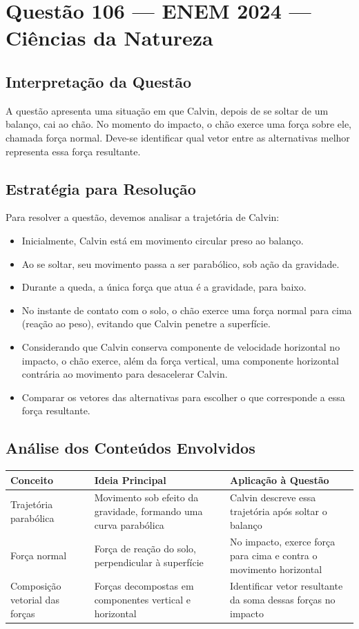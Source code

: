 \documentclass{article}
\begin{document}
\section*{Questão 106 — ENEM 2024 — Ciências da Natureza}

\subsection*{Interpretação da Questão}
A questão apresenta uma situação em que Calvin, depois de se soltar de um balanço, cai ao chão. No momento do impacto, o chão exerce uma força sobre ele, chamada força normal. Deve-se identificar qual vetor entre as alternativas melhor representa essa força resultante.

\subsection*{Estratégia para Resolução}
Para resolver a questão, devemos analisar a trajetória de Calvin:
\begin{itemize}
  \item Inicialmente, Calvin está em movimento circular preso ao balanço.
  \item Ao se soltar, seu movimento passa a ser parabólico, sob ação da gravidade.
  \item Durante a queda, a única força que atua é a gravidade, para baixo.
  \item No instante de contato com o solo, o chão exerce uma força normal para cima (reação ao peso), evitando que Calvin penetre a superfície.
  \item Considerando que Calvin conserva componente de velocidade horizontal no impacto, o chão exerce, além da força vertical, uma componente horizontal contrária ao movimento para desacelerar Calvin.
  \item Comparar os vetores das alternativas para escolher o que corresponde a essa força resultante.
\end{itemize}

\subsection*{Análise dos Conteúdos Envolvidos}
\begin{center}
\begin{tabular}{|p{4cm}|p{5cm}|p{6cm}|}
\hline
\textbf{Conceito} & \textbf{Ideia Principal} & \textbf{Aplicação à Questão} \\
\hline
Trajetória parabólica & Movimento sob efeito da gravidade, formando uma curva parabólica & Calvin descreve essa trajetória após soltar o balanço \\
\hline
Força normal & Força de reação do solo, perpendicular à superfície & No impacto, exerce força para cima e contra o movimento horizontal \\
\hline
Composição vetorial das forças & Forças decompostas em componentes vertical e horizontal & Identificar vetor resultante da soma dessas forças no impacto \\
\hline
\end{tabular}
\end{center}
\end{document}
